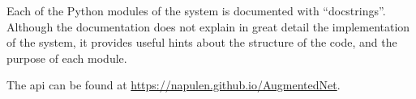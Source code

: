 
Each of the Python modules of the system is documented with
``docstrings''.
Although the documentation does not explain in great detail
the implementation of the system, it provides useful hints
about the structure of the code, and the purpose of each
module.

The \gls{api} can be found at
\href{https://napulen.github.io/AugmentedNet}{https://napulen.github.io/AugmentedNet}.
